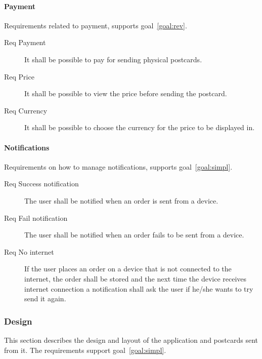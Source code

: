 \documentclass[10pt,a4paper]{article}
\begin{document}
\paragraph{Payment}
Requirements related to payment, supports goal~\ref{goal:rev}.
\begin{description}
\item [Req \thesubsubsection {} Payment] It shall be possible to pay for sending physical postcards.
	
\item [Req \thesubsubsection {} Price] It shall be possible to view the price before sending the postcard.
	
\item [Req \thesubsubsection {} Currency] It shall be possible to choose the currency for the price to be displayed in.
	
\end{description}

\paragraph{Notifications}
Requirements on how to manage notifications, supports goal~\ref{goal:simpl}.

\begin{description}


	\item [Req \thesubsubsection {} Success notification] The user shall be notified when an order is sent from a device.

	\item [Req \thesubsubsection {} Fail notification] The user shall be notified when an order fails to be sent from a device.


	\item [Req \thesubsubsection {} No internet] If the user places an order on a device that is not connected to the internet, the order shall be stored and the next time the device receives internet connection a notification shall ask the user if he/she wants to try send it again. 

\end{description}

\subsubsection{Design}
This section describes the design and layout of the application and postcards sent from it. The requirements support goal~\ref{goal:simpl}. 
\end{document}
